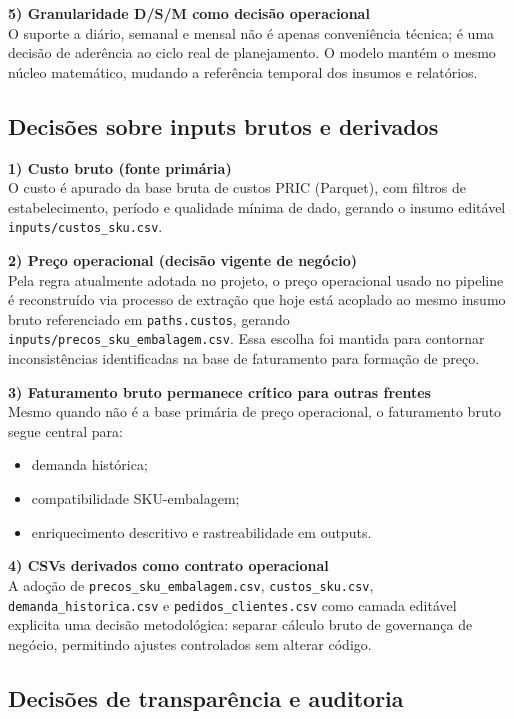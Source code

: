 \documentclass[11pt,a4paper]{article}
\begin{document}
\textbf{5) Granularidade D/S/M como decisão operacional}\\
O suporte a diário, semanal e mensal não é apenas conveniência técnica; é uma
decisão de aderência ao ciclo real de planejamento. O modelo mantém o mesmo
núcleo matemático, mudando a referência temporal dos insumos e relatórios.

\subsection{Decisões sobre inputs brutos e derivados}

\textbf{1) Custo bruto (fonte primária)}\\
O custo é apurado da base bruta de custos PRIC (Parquet), com filtros de
estabelecimento, período e qualidade mínima de dado, gerando o insumo editável
\texttt{inputs/custos\_sku.csv}.

\textbf{2) Preço operacional (decisão vigente de negócio)}\\
Pela regra atualmente adotada no projeto, o preço operacional usado no pipeline
é reconstruído via processo de extração que hoje está acoplado ao mesmo insumo
bruto referenciado em \texttt{paths.custos}, gerando
\texttt{inputs/precos\_sku\_embalagem.csv}.  
Essa escolha foi mantida para contornar inconsistências identificadas na base de
faturamento para formação de preço.

\textbf{3) Faturamento bruto permanece crítico para outras frentes}\\
Mesmo quando não é a base primária de preço operacional, o faturamento bruto
segue central para:
\begin{itemize}[leftmargin=1.2cm]
    \item demanda histórica;
    \item compatibilidade SKU-embalagem;
    \item enriquecimento descritivo e rastreabilidade em outputs.
\end{itemize}

\textbf{4) CSVs derivados como contrato operacional}\\
A adoção de \texttt{precos\_sku\_embalagem.csv}, \texttt{custos\_sku.csv},
\texttt{demanda\_historica.csv} e \texttt{pedidos\_clientes.csv} como camada
editável explicita uma decisão metodológica: separar cálculo bruto de governança
de negócio, permitindo ajustes controlados sem alterar código.

\subsection{Decisões de transparência e auditoria}
\end{document}
